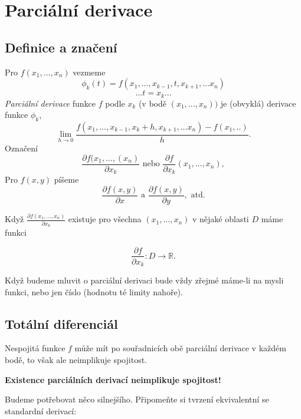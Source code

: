 \documentclass[../main.tex]{subfiles}
\begin{document}
\section{Parciální derivace}

\subsection{Definice a značení}
\hspace{1.2mm}
Pro $f(x_1,...,x_n)$ vezmeme 
\[\phi_k(t) = f(x_1,...,x_{k-1},t,x_{k+1},...x_n)\]
\[... t = x_k...\]
\hspace{1.2mm}
\textit{Parciální derivace} funkce $f$ podle $x_k$ (v bodě $(x_1,...,x_n))$ je (obvyklá) derivace funkce $\phi_k$,
\[\lim_{h\rightarrow 0}\frac{f(x_1,...,x_{k-1},x_k+h,x_{k+1},...x_n) - f(x_1,..)}{h}.\]
\hspace{1.2mm}
Označení
\[\frac{\partial f(x_1,...,(x_n)}{\partial x_k} \textrm{ nebo } \frac{\partial f}{\partial x_k} (x_1,...,x_n),\]
\hspace{1.2mm}
Pro $f(x,y)$ píšeme
\[\frac{\partial f(x,y)}{\partial x} \textrm{ a } \frac{\partial f(x,y)}{\partial y}, \textrm{ atd.}\]

\noindent
\hspace{1.2mm}
Když $\frac{\partial f(x_1,...,x_n)}{\partial x_k}$ existuje pro všechna $(x_1,...,x_n)$ v nějaké oblasti $D$ máme funkci

\[\frac{\partial f}{\partial x_k}: D \rightarrow \mathbb{R}.\]

\noindent
\hspace{1.2mm}
Když budeme mluvit o parciální derivaci bude vždy zřejmé máme-li na mysli funkci, nebo jen číslo (hodnotu té limity nahoře).
\noindent

\subsection{Totální diferenciál}
\hspace{1.2mm}
Nespojitá funkce $f$ může mít po souřadnicích obě parciální derivace v každém bodě, to však ale neimplikuje spojitost.
\begin{center}
    \textbf{Existence parciálních derivací neimplikuje spojitost!}
\end{center}
\hspace{1.2mm}
Budeme potřebovat něco silnejšího. Připomeňte si tvrzení ekvivalentní se standardní derivací:
\end{document}
